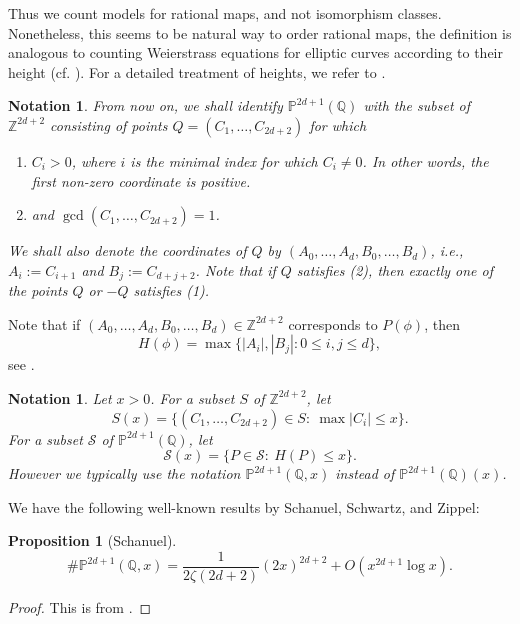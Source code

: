 \documentclass[12pt]{amsart}
\newtheorem{notn}[theorem]{Notation}
\newtheorem{proposition}[theorem]{Proposition}
\newcommand{\Z}{\mathbb{Z}}
\newcommand{\Q}{\mathbb{Q}}
\numberwithin{equation}{section}
\begin{document}
Thus we count models for rational maps, and not isomorphism classes. Nonetheless, this seems to be natural way to order rational maps, the definition is analogous to counting Weierstrass equations for elliptic curves according to their height (cf. \cite{cremonasadek}). For a detailed treatment of heights, we refer to \cite{BomGub}. 


\begin{notn}\label{notation}
From now on, we shall identify $\mathbb{P}^{2d+1}(\Q)$ with the subset of $\Z^{2d+2}$ consisting of points $Q=(C_1, \dots, C_{2d+2})$ for which 
\begin{enumerate}
    \item $C_i>0$, where $i$ is the minimal index for which $C_i\neq 0$. In other words, the first non-zero coordinate is positive.
    \item and $\gcd(C_1, \dots, C_{2d+2}) = 1$.
\end{enumerate}
We shall also denote the coordinates of $Q$ by $(A_0, \dots, A_d, B_0, \dots, B_d)$, i.e., $A_i:=C_{i+1}$ and $B_j:=C_{d+j+2}$. 
Note that if $Q$ satisfies (2), then exactly one of the points $Q$ or $-Q$ satisfies (1).
\end{notn}
Note that if $(A_0, \dots, A_d, B_0, \dots, B_d) \in \mathbb{Z}^{2d+2}$ corresponds to $ P(\phi) $, then
\[ H(\phi) = \max\{|A_i|, |B_j|: 0 \leq i, j \leq d\}, \] see \cite[Chapter~1]{BomGub}.

\begin{notn}\label{notation (x)}
Let $x>0$. For a subset $S$ of $\Z^{2d+2}$, let
$$S(x)=\{(C_1,\ldots,C_{2d+2})\in S:\ \max|C_i|\leq x\}.$$
For a subset $\mathcal{S}$ of $\mathbb{P}^{2d+1}(\Q)$, let
$$\mathcal{S}(x)=\{P\in\mathcal{S}:\ H(P)\leq x\}.$$
However we typically use the notation $\mathbb{P}^{2d+1}(\Q,x)$ instead
of $\mathbb{P}^{2d+1}(\Q)(x)$.
\end{notn}



We have the following well-known results by Schanuel, Schwartz, and Zippel:
\begin{proposition}[Schanuel]\label{schanuel prop}
    \begin{equation}\label{schanuel eqn}\# \mathbb{P}^{2d+1}(\Q, x)= \frac{1}{2\zeta(2d+2)}(2x)^{2d+2}+O\left( x^{2d+1}\log x\right).\end{equation}
\end{proposition}
\begin{proof}
    This is from \cite[Theorem 1]{schanuel}.
\end{proof}
\end{document}
